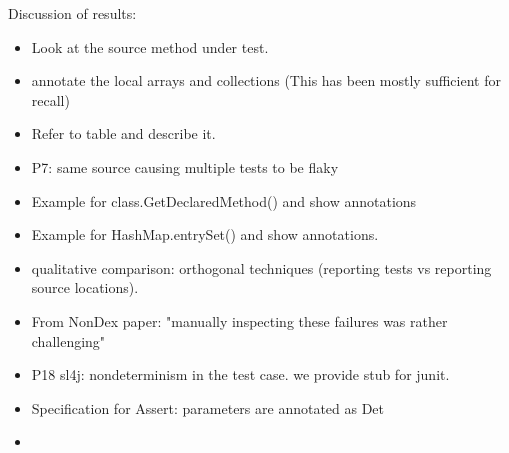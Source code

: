 Discussion of results:

\begin{itemize}
    \item Look at the source method under test.
    \item annotate the local arrays and collections (This has been mostly sufficient for recall)
    \item Refer to table and describe it.
    \item P7: same source causing multiple tests to be flaky
    \item Example for class.GetDeclaredMethod() and show annotations
    \item Example for HashMap.entrySet() and show annotations.
    \item qualitative comparison: orthogonal techniques (reporting tests vs reporting source locations).
    \item From NonDex paper: "manually inspecting these failures was rather challenging"
    \item P18 sl4j: nondeterminism in the test case. we provide stub for junit.
    \item Specification for Assert: parameters are annotated as Det
    \item {}
\end{itemize}


